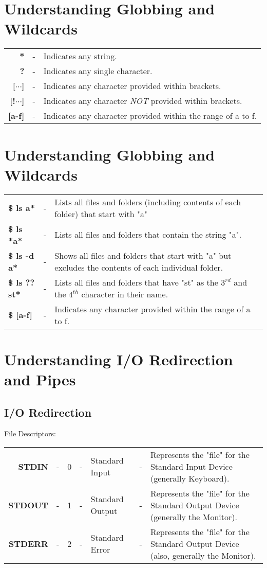 \section{Understanding Globbing and Wildcards}
\begin{tabular}{rcl}
	\textbf{*} &- &Indicates any string. \\
	\textbf{?} &- &Indicates any single character. \\
	\textbf{[$\cdots$]} &- &Indicates any character provided within brackets. \\
	\textbf{[!$\cdots$]} &- &Indicates any character \textit{NOT} provided within brackets. \\
	\textbf{[a-f]} &- &Indicates any character provided within the range of a to f. \\
\end{tabular}

\section{Understanding Globbing and Wildcards}
\noindent
\begin{tabular}{lcp{}}
	\textbf{\$ ls a*} &- &Lists all files and folders (including contents of each folder) that start with "a" \\
	\textbf{\$ ls *a*} &- &Lists all files and folders that contain the string "a". \\
	\textbf{\$ ls -d a*} &- &Shows all files and folders that start with "a" but excludes the contents of each individual folder. \\
	\textbf{\$ ls ??st*} &- &Lists all files and folders that have "st" as the $3^{rd}$ and the $4^{th}$ character in their name. \\
	\textbf{\$ [a-f]} &- &Indicates any character provided within the range of a to f. \\
\end{tabular}

\section{Understanding I/O Redirection and Pipes}
\subsection{I/O Redirection}
File Descriptors: 

\noindent
\begin{tabular}{rccclcp{}}
	\textbf{STDIN} &- &0 &- &Standard Input &- &Represents the "file" for the Standard Input Device (generally Keyboard). \\
	\textbf{STDOUT} &- &1 &- &Standard Output &- &Represents the "file" for the Standard Output Device (generally the Monitor). \\
	\textbf{STDERR} &- &2 &- &Standard Error &- &Represents the "file" for the Standard Output Device (also, generally the Monitor). \\
\end{tabular}

